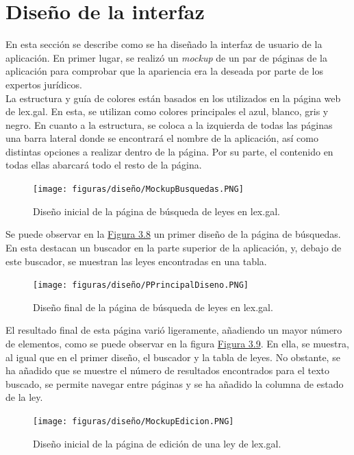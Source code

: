 \section{Diseño de la interfaz}

En esta sección se describe como se ha diseñado la interfaz de usuario de la aplicación. En primer lugar, se realizó un {\it mockup} \cite{mockup} de un par de páginas de la aplicación para comprobar que la apariencia era la deseada por parte de los expertos jurídicos.
\\

La estructura y guía de colores están basados en los utilizados en la página web de lex.gal. En esta, se utilizan como colores principales el azul, blanco, gris y negro. En cuanto a la estructura, se coloca a la izquierda de todas las páginas una barra lateral donde se encontrará el nombre de la aplicación, así como distintas opciones a realizar dentro de la página. Por su parte, el contenido en todas ellas abarcará todo el resto de la página.

\begin{figure}[H]
\centerline{\texttt{[image: figuras/diseño/MockupBusquedas.PNG]}}
\caption{Diseño inicial de la página de búsqueda de leyes en lex.gal.}
\label{enlaceMockupPrincipalDiseno}
\end{figure}

Se puede observar en la \hyperref[enlaceMockupPrincipalDiseno]{Figura 3.8} un primer diseño de la página de búsquedas. En esta destacan un buscador en la parte superior de la aplicación, y, debajo de este buscador, se muestran las leyes encontradas en una tabla.

\begin{figure}[H]
\centerline{\texttt{[image: figuras/diseño/PPrincipalDiseno.PNG]}}
\caption{Diseño final de la página de búsqueda de leyes en lex.gal.}
\label{enlacePPrincipalDiseno}
\end{figure}

El resultado final de esta página varió ligeramente, añadiendo un mayor número de elementos, como se puede observar en la figura \hyperref[enlacePPrincipalDiseno]{Figura 3.9}. En ella, se muestra, al igual que en el primer diseño, el buscador y la tabla de leyes. No obstante, se ha añadido que se muestre el número de resultados encontrados para el texto buscado, se permite navegar entre páginas y se ha añadido la columna de estado de la ley.

\begin{figure}[H]
\centerline{\texttt{[image: figuras/diseño/MockupEdicion.PNG]}}
\caption{Diseño inicial de la página de edición de una ley de lex.gal.}
\label{enlaceMockupEdicionDiseno}
\end{figure}

